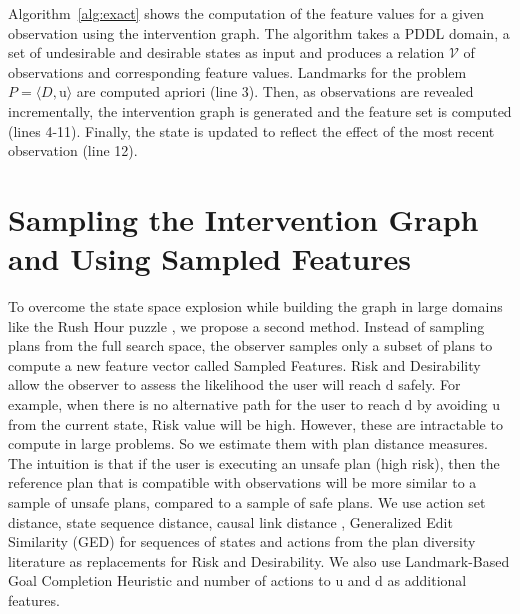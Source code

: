 \documentclass[letterpaper]{article}
\theoremstyle{plain}
\begin{document}
Algorithm~\ref{alg:exact} shows the computation of the feature values for a given observation using the intervention graph. The algorithm takes a PDDL domain, a set of undesirable and desirable states as input and produces a relation $\mathcal{V}$ of observations and corresponding feature values. Landmarks for the problem $P = \langle D, \mathrm{u}\rangle$ are computed apriori (line 3). Then, as observations are revealed incrementally, the intervention graph is generated and the feature set is computed (lines 4-11). Finally, the state is updated to reflect the effect of the most recent observation (line 12).

\section{Sampling the Intervention Graph and Using Sampled Features}
To overcome the state space explosion while building the graph in large domains like the Rush Hour puzzle \cite{fernau2003}, we propose a second method. Instead of sampling plans from the full search space, the observer samples only a subset of plans to compute a new feature vector called Sampled Features.
Risk and Desirability allow the observer to assess the likelihood the user will reach $\mathrm{d}$ safely. For example, when there is no alternative path for the user to reach $\mathrm{d}$ by avoiding $\mathrm{u}$ from the current state, Risk value will be high. However, these are intractable to compute in large problems. So we estimate them with plan distance measures. The intuition is that if the user is executing an unsafe plan (high risk), then the reference plan that is compatible with observations will be more similar to a sample of unsafe plans, compared to a sample of safe plans. We use action set distance, state sequence distance, causal link distance \cite{nguyen2012generating}, Generalized Edit Similarity (GED) for sequences of states and actions \cite{sohrabi2016finding} from the plan diversity literature as replacements for Risk and Desirability. We also use Landmark-Based Goal Completion Heuristic \cite{pereira2017} and number of actions to $\mathrm{u}$ and $\mathrm{d}$ as additional features.
\end{document}
